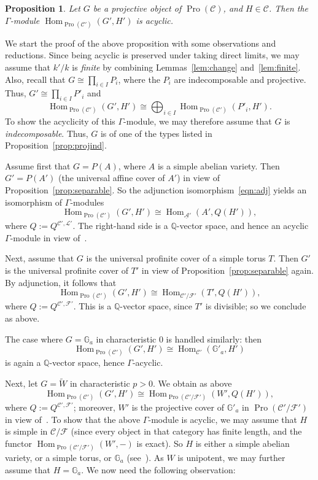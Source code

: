 \documentclass[11pt]{article}
\newtheorem{prop}[theo]{Proposition}
\theoremstyle{definition}
\numberwithin{equation}{section}
\newcommand\bG{{\mathbb G}}
\newcommand\bQ{{\mathbb Q}}
\newcommand\cC{{\mathcal C}}
\newcommand\cF{{\mathcal F}}
\newcommand\cL{{\mathcal L}}
\newcommand\tW{{\widetilde W}}
\newcommand\ucA{\underline{\mathcal A}}
\DeclareMathOperator{\Hom}{Hom}
\DeclareMathOperator{\Pro}{Pro}
\theoremstyle{remark}
\begin{document}
\begin{prop}\label{prop:acyclic}
Let $G$ be a projective object of $\Pro(\cC)$, and $H \in \cC$. Then the $\Gamma$-module $\Hom_{\Pro(\cC')}(G',H')$ is acyclic.
\end{prop}


We start the proof of the above proposition with some observations and reductions. Since being acyclic is preserved under taking direct limits, we may assume that $k'/k$ is \emph{finite} by combining Lemmas~\ref{lem:change} and~\ref{lem:finite}. Also, recall that $G \cong \prod_{i \in I} P_i$, where the $P_i$ are indecomposable and projective. Thus, $G' \cong \prod_{i \in I} P'_i$ and
\[
\Hom_{\Pro(\cC')}(G', H')
\cong \bigoplus_{i \in I}
\Hom_{\Pro(\cC')}(P'_i, H').
\]
To show the acyclicity of this $\Gamma$-module, we may therefore assume that $G$ is \emph{indecomposable}. Thus, $G$ is of one of the types listed in Proposition~\ref{prop:projind}.

Assume first that $G = P(A)$, where $A$ is a simple abelian variety. Then $G' = P(A')$ (the universal affine cover of $A'$) in view of Proposition~\ref{prop:separable}. So the adjunction isomorphism~\eqref{eqn:adj} yields an isomorphism of $\Gamma$-modules
\[
\Hom_{\Pro(\cC')}(G',H') \cong \Hom_{\ucA'}(A', Q(H')),
\]
where $Q := Q^{\cC', \cL'}$. The right-hand side is a $\bQ$-vector space, and hence an acyclic $\Gamma$-module in view of~\cite[V.3.5.1]{DG}.

Next, assume that $G$ is the universal profinite cover of a simple torus $T$. Then $G'$ is the universal profinite cover of $T'$ in view of Proposition~\ref{prop:separable} again. By adjunction, it follows that
\[
\Hom_{\Pro(\cC')}(G',H') \cong
\Hom_{\cC'/\cF'}(T', Q(H')),
\]
where $Q := Q^{\cC', \cF'}$. This is a $\bQ$-vector space, since $T'$ is divisible; so we conclude as above.

The case where $G = \bG_a$ in characteristic $0$ is handled similarly: then
\[
\Hom_{\Pro(\cC')}(G',H') \cong
\Hom_{\cC'}(\bG'_a,H')
\]
is again a $\bQ$-vector space, hence $\Gamma$-acyclic.

Next, let $G = \tW$ in characteristic $p > 0$. We obtain as above
\[
\Hom_{\Pro(\cC')}(G',H') \cong
\Hom_{\Pro(\cC'/\cF')}(W',Q (H')),
\]
where $Q := Q^{\cC',\cF'}$; moreover, $W'$ is the projective cover of $\bG'_a$ in $\Pro(\cC'/\cF')$ in view of~\cite[V.3.7.5]{DG}. To show that the above $\Gamma$-module is acyclic, we may assume that $H$ is simple in $\cC/\cF$ (since every object in that category has finite length, and the functor $\Hom_{\Pro(\cC'/\cF')}(W', -)$ is exact). So $H$ is either a simple abelian variety, or a simple torus, or $\bG_a$ (see~\cite[Prop.~3.2]{Br17a}). As $W$ is unipotent, we may further assume that $H = \bG_a$. We now need the following observation:
\end{document}
